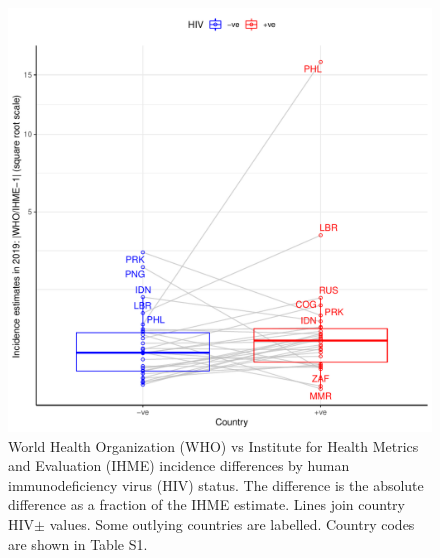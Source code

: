 \documentclass[12pt]{article}
\begin{document}
\begin{figure}
  \centering
  \includegraphics[width=1\textwidth]{../plots/aF9.pdf}
  \caption[WHO vs IHME incidence differences by HIV status]{World Health Organization (WHO) vs Institute for Health Metrics
    and Evaluation (IHME)
    incidence differences by human immunodeficiency virus (HIV) status. The difference is the absolute
    difference as a fraction of the IHME estimate. Lines join country HIV$\pm$
    values. Some outlying countries are labelled. Country codes are shown in
    Table S1. }
\end{figure}

\FloatBarrier
\end{document}
